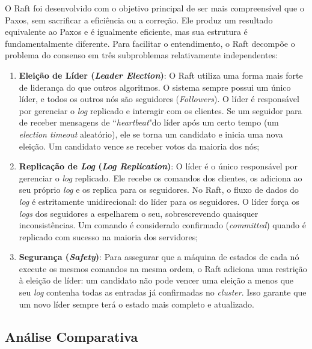         O Raft \cite{raft2014} foi desenvolvido com o objetivo principal de ser mais compreensível que o Paxos, sem sacrificar a eficiência ou a correção. Ele produz um resultado equivalente ao Paxos e é igualmente eficiente, mas sua estrutura é fundamentalmente diferente. Para facilitar o entendimento, o Raft decompõe o problema do consenso em três subproblemas relativamente independentes:
    
        \begin{enumerate}
            \item \textbf{Eleição de Líder (\textit{Leader Election})}: O Raft utiliza uma forma mais forte de liderança do que outros algoritmos. O sistema sempre possui um único líder, e todos os outros nós são seguidores (\textit{Followers}). O líder é responsável por gerenciar o \textit{log} replicado e interagir com os clientes. Se um seguidor para de receber mensagens de ``\textit{heartbeat}"do líder após um certo tempo (um \textit{election timeout} aleatório), ele se torna um candidato e inicia uma nova eleição. Um candidato vence se receber votos da maioria dos nós;
            
            \item \textbf{Replicação de \textit{Log} (\textit{Log Replication})}: O líder é o único responsável por gerenciar o \textit{log} replicado. Ele recebe os comandos dos clientes, os adiciona ao seu próprio \textit{log} e os replica para os seguidores. No Raft, o fluxo de dados do \textit{log} é estritamente unidirecional: do líder para os seguidores. O líder força os \textit{logs} dos seguidores a espelharem o seu, sobrescrevendo quaisquer inconsistências. Um comando é considerado confirmado (\textit{committed}) quando é replicado com sucesso na maioria dos servidores;
            
            \item \textbf{Segurança (\textit{Safety})}: Para assegurar que a máquina de estados de cada nó execute os mesmos comandos na mesma ordem, o Raft adiciona uma restrição à eleição de líder: um candidato não pode vencer uma eleição a menos que seu \textit{log} contenha todas as entradas já confirmadas no \textit{cluster}. Isso garante que um novo líder sempre terá o estado mais completo e atualizado.
        \end{enumerate}

    

    \subsection{Análise Comparativa}

